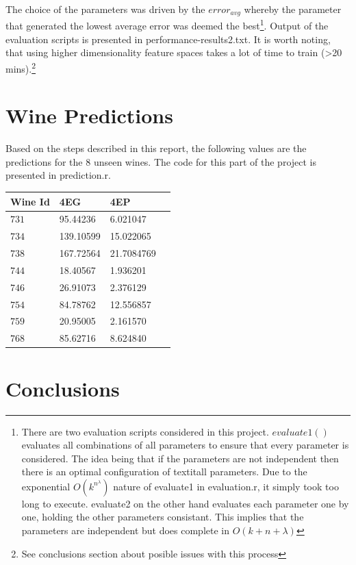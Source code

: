 \documentclass[twocolumn]{article}
\begin{document}
The choice of the parameters was driven by the $error_{avg}$ whereby the parameter that generated the lowest average error was deemed the
best\footnote{There are two evaluation scripts considered in this project. $evaluate1()$ evaluates all combinations of all parameters to ensure 
that every parameter is considered. The idea being that if the parameters are not independent then there is an optimal configuration of 
textit{all} parameters. Due to the exponential $O(k^{n^{\lambda}})$ nature of evaluate1 in evaluation.r, it simply took too long to execute. 
evaluate2 on the other hand evaluates each parameter one by one, holding the other parameters consistant. This implies that the parameters 
are independent but does complete in $O(k+n+\lambda)$}. Output of the evaluation scripts is presented in performance-results2.txt. It is worth
noting, that using higher dimensionality feature spaces takes a lot of time to train (\textgreater 20 mins).\footnote{See conclusions section
about posible issues with this process}

\section{Wine Predictions}
Based on the steps described in this report, the following values are the predictions for the 8 unseen wines. The code for this part
of the project is presented in prediction.r. 

\begin{center}
	\begin{tabular}{| p{15mm} | p{20mm} | p{20mm} | p{20mm} | }
	\hline Wine Id & 4EG & 4EP \\ \hline
	\( 731\) & 95.44236 & 6.021047 \\ \hline
	\( 734\) & 139.10599 & 15.022065 \\ \hline
	\( 738\) & 167.72564 & 21.7084769 \\ \hline
	\( 744\) & 18.40567 & 1.936201 \\ \hline
	\( 746\) & 26.91073 & 2.376129 \\ \hline
	\( 754\) & 84.78762 & 12.556857 \\ \hline
	\( 759\) & 20.95005 & 2.161570 \\ \hline
	\( 768\) & 85.62716 & 8.624840 \\ \hline
	\end{tabular} 
\end{center}

\section{Conclusions}
\end{document}
